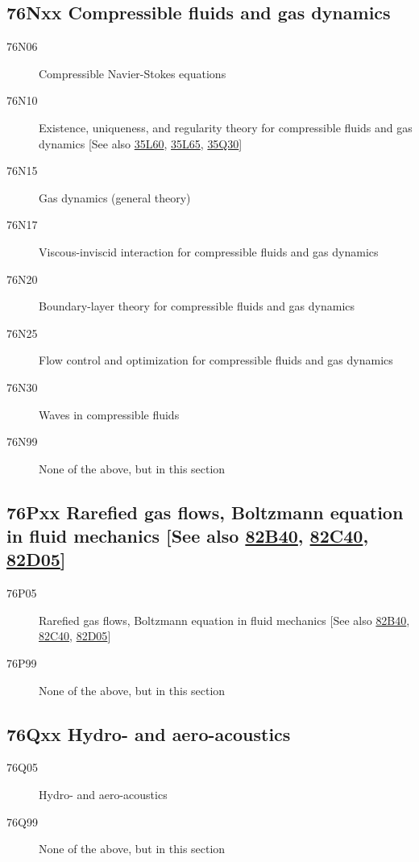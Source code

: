 \subsection*{76Nxx  Compressible fluids and gas dynamics }\label{76Nxx}
\begin{description}  
\item [76N06]\label{76N06} Compressible Navier-Stokes equations
\item [76N10]\label{76N10} Existence, uniqueness, and regularity theory for compressible fluids and gas dynamics [See also \hyperref[35L60]{35L60}, \hyperref[35L65]{35L65}, \hyperref[35Q30]{35Q30}]
\item [76N15]\label{76N15} Gas dynamics (general theory)
\item [76N17]\label{76N17} Viscous-inviscid interaction for compressible fluids and gas dynamics
\item [76N20]\label{76N20} Boundary-layer theory for compressible fluids and gas dynamics
\item [76N25]\label{76N25} Flow control and optimization for compressible fluids and gas dynamics
\item [76N30]\label{76N30} Waves in compressible fluids
\item [76N99]\label{76N99} None of the above, but in this section
\end{description}
\subsection*{76Pxx  Rarefied gas flows, Boltzmann equation in fluid mechanics [See also \hyperref[82B40]{82B40}, \hyperref[82C40]{82C40}, \hyperref[82D05]{82D05}] }\label{76Pxx}
\begin{description}  
\item [76P05]\label{76P05} Rarefied gas flows, Boltzmann equation in fluid mechanics [See also \hyperref[82B40]{82B40}, \hyperref[82C40]{82C40}, \hyperref[82D05]{82D05}]
\item [76P99]\label{76P99} None of the above, but in this section
\end{description}
\subsection*{76Qxx  Hydro- and aero-acoustics }\label{76Qxx}
\begin{description}  
\item [76Q05]\label{76Q05} Hydro- and aero-acoustics
\item [76Q99]\label{76Q99} None of the above, but in this section
\end{description}
